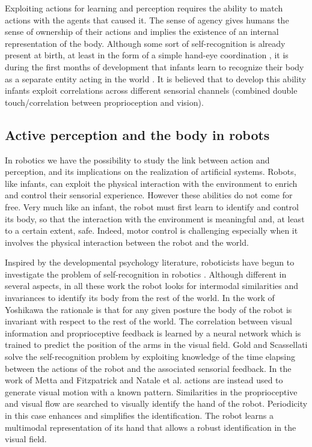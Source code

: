 Exploiting actions for learning and perception requires the ability to
match actions with the agents that caused it. The sense of agency
\cite{jeannerod02mechanism} gives humans the sense of ownership of
their actions and implies the existence of an internal representation
of the body. Although some sort of self-recognition is already present
at birth, at least in the form of a simple hand-eye coordination
\cite{meer95thefunctional}, it is during the first months of
development that infants learn to recognize their body as a separate
entity acting in the world \cite{rochat00perceived}. It is believed
that to develop this ability infants exploit correlations across
different sensorial channels (combined double touch/correlation
between proprioception and vision).


\subsection{Active perception and the body in robots}

In robotics we have the possibility to study the link between action
and perception, and its implications on the realization of artificial
systems. Robots, like infants, can exploit the physical interaction with
the environment to enrich and control their sensorial
experience. However these abilities do not come for free. Very much
like an infant, the robot must first learn to identify and control its
body, so that the interaction with the environment is meaningful and,
at least to a certain extent, safe. Indeed, motor control is
challenging especially when it involves the physical interaction
between the robot and the world.

Inspired by the developmental psychology literature, roboticists have
begun to investigate the problem of self-recognition in robotics
\cite{yoshikawa03doestheinvariance,metta03early,natale05exploring,gold05learning}. Although
different in several aspects, in all these work the robot looks for
intermodal similarities and invariances to identify its body from the
rest of the world.  In the work of Yoshikawa
\cite{yoshikawa03doestheinvariance} the rationale is that for any
given posture the body of the robot is invariant with respect to the
rest of the world. The correlation between visual information and
proprioceptive feedback is learned by a neural network which is trained
to predict the position of the arms in the visual field.  Gold and
Scassellati \cite{gold05learning} solve the self-recognition problem
by exploiting knowledge of the time elapsing between the actions of
the robot and the associated sensorial feedback.  In the work of Metta
and Fitzpatrick \cite{metta03early} and Natale et
al. \cite{natale05exploring} actions are instead used to generate
visual motion with a known pattern. Similarities in the proprioceptive
and visual flow are searched to visually identify the hand of the
robot. Periodicity in this case enhances and simplifies the
identification. The robot learns a multimodal representation of its
hand that allows a robust identification in the visual field.

